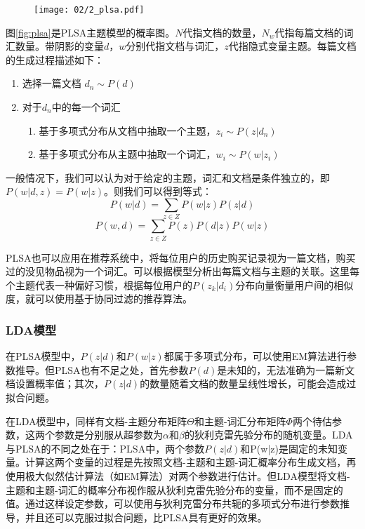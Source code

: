 \begin{figure}
 \centering
 \texttt{[image: 02/2\_plsa.pdf]}
\end{figure}

图\ref{fig:plsa}是PLSA主题模型的概率图。$N$代指文档的数量，$N_w$代指每篇文档的词汇数量。带阴影的变量$d$，$w$分别代指文档与词汇，$z$代指隐式变量主题。每篇文档的生成过程描述如下：

\begin{enumerate}
\item 选择一篇文档 $d_n \sim P(d)$
\item 对于$d_n$中的每一个词汇
       \begin{enumerate}[fullwidth,itemindent=1em,label=(\alph*)]
       \item 基于多项式分布从文档中抽取一个主题，$z_i \sim P(z|d_n)$
       \item 基于多项式分布从主题中抽取一个词汇，$w_i \sim P(w|z_i)$
       \end{enumerate}
\end{enumerate}

一般情况下，我们可以认为对于给定的主题，词汇和文档是条件独立的，即$P(w|d,z) = P(w|z)$。则我们可以得到等式：
\begin{equation}
	P(w|d) = \sum_{z\in Z}P(w|z)P(z|d)
\end{equation}
\begin{equation}
	P(w,d) = \sum_{z\in Z}P(z)P(d|z)P(w|z)
\end{equation}

PLSA也可以应用在推荐系统中，将每位用户的历史购买记录视为一篇文档，购买过的没见物品视为一个词汇。可以根据模型分析出每篇文档与主题的关联。这里每个主题代表一种偏好习惯，根据每位用户的$P(z_k|d_i)$分布向量衡量用户间的相似度，就可以使用基于协同过滤的推荐算法。

\subsubsection{LDA模型}


在PLSA模型中，$P(z|d)$和$P(w|z)$都属于多项式分布，可以使用EM算法进行参数推导。但PLSA也有不足之处，首先参数$P(d)$是未知的，无法准确为一篇新文档设置概率值；其次，$P(z|d)$的数量随着文档的数量呈线性增长，可能会造成过拟合问题。

在LDA\parencite{blei2003latent}模型中，同样有文档-主题分布矩阵$\Theta$和主题-词汇分布矩阵$\Phi$两个待估参数，这两个参数是分别服从超参数为$\alpha$和$\beta$的狄利克雷先验分布的随机变量。LDA与PLSA的不同之处在于：PLSA中，两个参数$P(z|d)$和P(w|z)是固定的未知变量。计算这两个变量的过程是先按照文档-主题和主题-词汇概率分布生成文档，再使用极大似然估计算法（如EM算法）对两个参数进行估计。但LDA模型将文档-主题和主题-词汇的概率分布视作服从狄利克雷先验分布的变量，而不是固定的值。通过这样设定参数，可以使用与狄利克雷分布共轭的多项式分布进行参数推导，并且还可以克服过拟合问题，比PLSA具有更好的效果。

